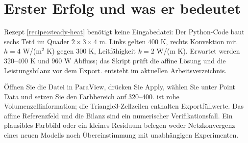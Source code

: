 \section{Erster Erfolg und was er bedeutet}
Rezept \ref{recipe:steady-heat} benötigt keine Eingabedatei: Der Python-Code
baut sechs Tet4 im Quader $2\times3\times4$ m. Links gelten 400 K, rechts
Konvektion mit $h=4$ W/(m$^2$ K) gegen 300 K, Leitfähigkeit
$k=2$ W/(m K). Erwartet werden 320--400 K und 960 W Abfluss;
das Skript prüft die affine Lösung und die Leistungsbilanz vor dem Export.
 entsteht im aktuellen Arbeitsverzeichnis.

Öffnen Sie die Datei in ParaView, drücken Sie Apply, wählen Sie
 unter Point Data und setzen Sie den Farbbereich auf
320--400.  ist rohe Volumenzellinformation; die
Triangle3-Zellzeilen enthalten Exportfüllwerte. Das affine Referenzfeld und
die Bilanz sind ein numerischer Verifikationsfall. Ein plausibles Farbbild
oder ein kleines Residuum belegen weder Netzkonvergenz eines neuen Modells
noch Übereinstimmung mit unabhängigen Experimenten.

